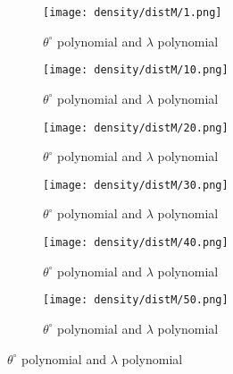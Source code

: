 \begin{figure}
\centering
\begin{subfigure}{.45\textwidth}
  \centering
  \texttt{[image: density/distM/1.png]}
  \caption{$\theta^{\circ}$ polynomial and $\lambda$ polynomial}
  \label{fig3:sub1}
\end{subfigure}%
\begin{subfigure}{.45\textwidth}
  \centering
  \texttt{[image: density/distM/10.png]}
  \caption{$\theta^{\circ}$ polynomial and $\lambda$ polynomial}
  \label{fig3:sub1}
\end{subfigure}%

\begin{subfigure}{.45\textwidth}
  \centering
  \texttt{[image: density/distM/20.png]}
  \caption{$\theta^{\circ}$ polynomial and $\lambda$ polynomial}
  \label{fig3:sub1}
\end{subfigure}%
\begin{subfigure}{.45\textwidth}
  \centering
  \texttt{[image: density/distM/30.png]}
  \caption{$\theta^{\circ}$ polynomial and $\lambda$ polynomial}
  \label{fig3:sub1}
\end{subfigure}%

\begin{subfigure}{.45\textwidth}
  \centering
  \texttt{[image: density/distM/40.png]}
  \caption{$\theta^{\circ}$ polynomial and $\lambda$ polynomial}
  \label{fig3:sub1}
\end{subfigure}%
\begin{subfigure}{.45\textwidth}
  \centering
  \texttt{[image: density/distM/50.png]}
  \caption{$\theta^{\circ}$ polynomial and $\lambda$ polynomial}
  \label{fig3:sub1}
\end{subfigure}%
\end{figure}

